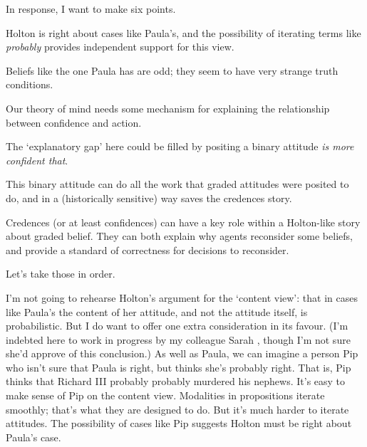 In response, I want to make six points.

\begin{enumerate*}
\item Holton is right about cases like Paula's, and the possibility of iterating terms like \textit{probably} provides independent support for this view.
\item Beliefs like the one Paula has are odd; they seem to have very strange truth conditions.
\item Our theory of mind needs some mechanism for explaining the relationship between confidence and action.
\item The `explanatory gap' here could be filled by positing a binary attitude \textit{is more confident that}.
\item This binary attitude can do all the work that graded attitudes were posited to do, and in a (historically sensitive) way saves the credences story.
\item Credences (or at least confidences) can have a key role within a Holton-like story about graded belief. They can both explain why agents reconsider some beliefs, and provide a standard of correctness for decisions to reconsider.
\end{enumerate*}
Let's take those in order.

I'm not going to rehearse Holton's argument for the `content view': that in cases like Paula's the content of her attitude, and not the attitude itself, is probabilistic. But I do want to offer one extra consideration in its favour. (I'm indebted here to work in progress by my colleague Sarah \cite{MossPragmaticsEpistemicModals}, though I'm not sure she'd approve of this conclusion.) As well as Paula, we can imagine a person Pip who isn't sure that Paula is right, but thinks she's probably right. That is, Pip thinks that Richard III probably probably murdered his nephews. It's easy to make sense of Pip on the content view. Modalities in propositions iterate smoothly; that's what they are designed to do. But it's much harder to iterate attitudes. The possibility of cases like Pip suggests Holton must be right about Paula's case.

